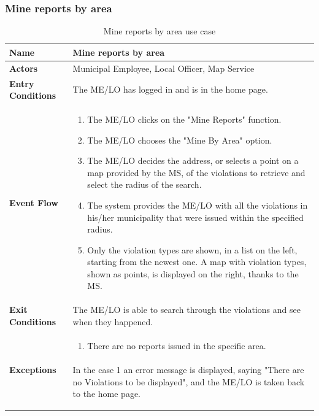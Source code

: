 					\subsubsection{Mine reports by area}
					\begin{table}[!h]
						\centering
						\vspace{-2mm}
						\begin{tabular}{lp{}}
							\toprule
							\textbf{Name} & \textbf{Mine reports by area} \\[1mm]
							\midrule
							\textbf{Actors} & Municipal Employee, Local Officer, Map Service \\[1mm]
							\textbf{Entry Conditions} & The ME/LO has logged in and is in the home page. \vspace{1mm}\\
							\textbf{Event Flow} &
							\vspace{-5mm} 
							\begin{enumerate}
								\setlength\itemsep{0.2mm}
								\item The ME/LO clicks on the "Mine Reports" function.
								\item The ME/LO chooses the "Mine By Area" option.
								\item The ME/LO decides the address, or selects a point on a map provided by the MS, of the violations to retrieve and select the radius of the search.
								\item The system provides the ME/LO with all the violations in his/her municipality that were issued within the specified radius.
								\item Only the violation types are shown, in a list on the left, starting from the newest one. A map with violation types, shown as points, is displayed on the right, thanks to the MS.
							\end{enumerate} \\
							\textbf{Exit Conditions} & The ME/LO is able to search through the violations and see when they happened. \vspace{1mm}\\
							\textbf{Exceptions} & 
								\vspace{-5mm} 
								\begin{enumerate}
									\item There are no reports issued in the specific area.
								\end{enumerate}
								\vspace{-7mm}
								\paragraph{}
									In the case 1 an error message is displayed, saying "There are no Violations to be displayed", and the ME/LO is taken back to the home page. \\
							\bottomrule
						\end{tabular}
						\caption{Mine reports by area use case}
					\end{table}
					\clearpage
